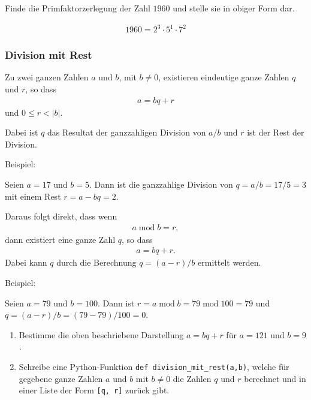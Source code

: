 \begin{Exercise}%

Finde die Primfaktorzerlegung der Zahl $1960$ und stelle sie in obiger Form dar.
\end{Exercise}

\begin{Answer}

\begin{align*}
    1960 = 2^3\cdot 5^1\cdot 7^2
\end{align*}
\end{Answer}


\subsubsection{Division mit Rest}
Zu zwei ganzen Zahlen $a$ und $b$, mit $b\neq 0$, existieren eindeutige ganze Zahlen $q$ und $r$, so dass
\begin{align}
    a = bq + r
\end{align}
und $0\leq r < |b|$.

Dabei ist $q$ das Resultat der ganzzahligen Division von $a/b$ und $r$ ist der Rest der Division.

Beispiel:

Seien $a = 17$ und $b=5$. Dann ist die ganzzahlige Division von $q=a/b=17/5=3$ mit einem Rest $r=a-bq=2$.

Daraus folgt direkt, dass wenn
\begin{align}
    a\; \text{mod}\; b = r,
\end{align}
dann existiert eine ganze Zahl $q$, so dass
\begin{align}
    a = bq + r.
\end{align}
Dabei kann $q$ durch die Berechnung $q = (a-r)/b$ ermittelt werden.

Beispiel:

Seien $a=79$ und $b=100$. Dann ist  $r = a\; \text{mod}\; b = 79\; \text{mod}\; 100 = 79$ und $q = (a-r)/b = (79-79)/100 = 0$.

\begin{Exercise}%

\begin{enumerate}[label=(\alph*)]
    \item Bestimme die oben beschriebene Darstellung $a = bq + r$ für $a = 121$ und $b = 9$.
    \item Schreibe eine Python-Funktion \texttt{def division_mit_rest(a,b)}, welche für gegebene ganze Zahlen $a$ und $b$ mit $b \neq 0$ die Zahlen $q$ und $r$ berechnet und in einer Liste der Form \texttt{[q, r]} zurück gibt.
\end{enumerate}
\end{Exercise}

